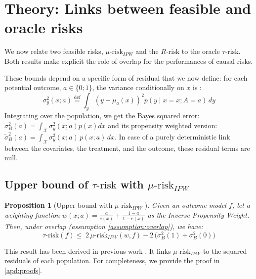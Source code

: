 \documentclass{report}
\newtheorem{proposition}{Proposition}
\begin{document}
\section{Theory: Links between feasible and oracle risks}\label{sec:theory}

We now relate two feasible risks, $\mu \text{-risk}_{IPW}$ and the
$R\text{-risk}$ to the oracle $\tau\text{-risk}$. Both results make
explicit the role of overlap for the performances of causal risks.

These bounds depend on a specific form of residual that we now define: for each potential outcome, $a \in  \{0; 1\}$, the variance conditionally on $x$
is \citep{shalit_estimating_2017}:
\begin{equation*}\label{eq:residuals}
  \sigma_{y}^{2}(x ; a) \overset{\text{def}}{=}
  \int_{y}\left(y-\mu_{a}(x)\right)^{2} p(y \mid x=x ; A=a) \, d y
\end{equation*}
Integrating over the population, we get the Bayes squared error:
$\sigma^2_{B}(a) = \int_{\mathcal X} \sigma_y^2(x;a) p(x)dx$
and its propensity weighted version:
$\tilde{\sigma}^2_{B}(a) = \int_{\mathcal X}\sigma_y^2(x;a)\,  p(x;
  a)\,dx$. In case of a purely deterministic link between the
covariates, the treatment, and the outcome, these residual terms are null.


\subsection{Upper bound of $\tau\text{-risk}$ with $\mu\text{-risk}_{IPW}$}%
\label{theory:mu_risk_ipw_bound}%

\begin{proposition}[Upper bound with $\mu \text{-risk}_{IPW}$
  ]\label{theory:prop:mu_risk_ipw_bound}
  \citep{johansson2022generalization} Given an outcome model $f$, let a
  weighting function $w(x; a) = \frac{a}{e(x)} + \frac{1-a}{1-e(x)}$ as the
  Inverse Propensity Weight. Then, under overlap (assumption
  \ref{assumption:overlap}), we have:
  \begin{equation*}
    \tau\text{-risk}(f) \leq \; 2 \, \mu\text{-risk}_{IPW}(w, f)
    - 2 \, \big(\sigma^2_{B}(1) +  \sigma^2_{B}(0)\big)
  \end{equation*}
\end{proposition}
This result has been derived in previous work
\citep{johansson2022generalization}. It links $\mu\text{-risk}_{IPW}$ to
the squared residuals of each population. For completeness, we provide the proof in \ref{apd:proofs}.
\end{document}
